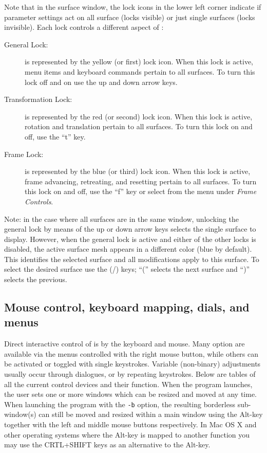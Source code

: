 Note that in the surface window, the lock icons in the lower left corner
indicate if parameter settings act on all surface (locks visible) or just
single surfaces (locks invisible).  Each lock controls a different aspect of 
\map{}:

\begin{description}
  \item [General Lock:] is represented by the yellow (or first) lock icon.  
        When this lock is active, menu items and keyboard commands pertain 
        to all surfaces.  To turn this lock off and on use the up
        and down arrow keys.
  \item [Transformation Lock: ] is represented by the red (or second) 
        lock icon.  When this lock is active, rotation and translation 
        pertain to all surfaces. To turn this lock on and off, use the
        ``t'' key.
  \item [Frame Lock: ] is represented by the blue (or third) lock icon.
        When this lock is active, frame advancing, retreating, and resetting
        pertain to all surfaces.  To turn this lock on and off, use the
        ``f'' key or select from the menu under \emph{Frame Controls}.
\end{description}

Note: in the case where all surfaces are in the same window, unlocking the
general lock by means of the up or down arrow keys selects the single
surface to display.  However, when the general lock is active and either of
the other locks is disabled, the active surface mesh appears in a different
color (blue by default).  This identifies the selected surface and all
modifications apply to this surface.  To select the desired surface use the
(/) keys; ``('' selects the next surface and ``)'' selects the previous.




\subsection{Mouse control, keyboard mapping, dials, and menus}
 
Direct interactive control of \map{} is by the keyboard and mouse.
Many option are available via the menus controlled with the right mouse
button, while others can be activated or toggled with single keystrokes.
Variable (non-binary) adjustments usually occur 
through dialogues, or by repeating keystrokes.  Below are tables of all the
current control devices and their function.  When the program launches, the
user sets one or more windows which can be resized and moved at any time.
When launching the program with the {\tt -b} option, the resulting
borderless sub-window(s) can still be moved and resized within a main
window using the Alt-key together with the left and middle mouse buttons
respectively.  In Mac OS X and other operating systems where the Alt-key is
mapped to another function you may use the CRTL+SHIFT keys as an
alternative to the Alt-key.


